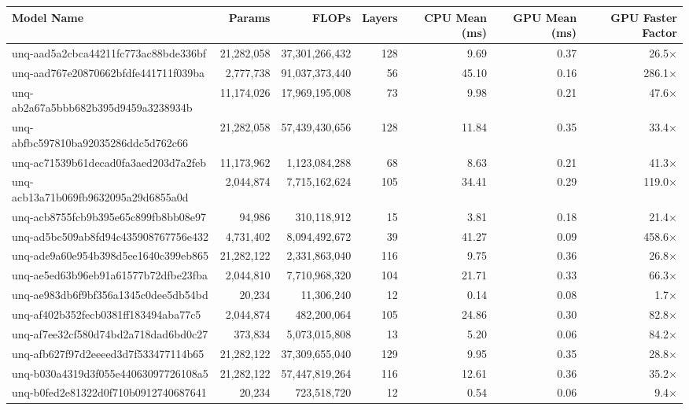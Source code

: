 \begin{table}[h!]
\centering
\fontsize{7}{9}\selectfont
\begin{tabular}{lrrrrrr}
\toprule
\textbf{Model Name} & \textbf{Params} & \textbf{FLOPs} & \textbf{Layers} & \textbf{CPU Mean (ms)} & \textbf{GPU Mean (ms)} & \textbf{GPU Faster Factor} \\
\midrule
unq-aad5a2cbca44211fc773ac88bde336bf & 21,282,058 & 37,301,266,432 & 128 & 9.69 & 0.37 & 26.5$\times$ \\
unq-aad767e20870662bfdfe441711f039ba & 2,777,738 & 91,037,373,440 & 56 & 45.10 & 0.16 & 286.1$\times$ \\
unq-ab2a67a5bbb682b395d9459a3238934b & 11,174,026 & 17,969,195,008 & 73 & 9.98 & 0.21 & 47.6$\times$ \\
unq-abfbc597810ba92035286ddc5d762c66 & 21,282,058 & 57,439,430,656 & 128 & 11.84 & 0.35 & 33.4$\times$ \\
unq-ac71539b61decad0fa3aed203d7a2feb & 11,173,962 & 1,123,084,288 & 68 & 8.63 & 0.21 & 41.3$\times$ \\
unq-acb13a71b069fb9632095a29d6855a0d & 2,044,874 & 7,715,162,624 & 105 & 34.41 & 0.29 & 119.0$\times$ \\
unq-acb8755fcb9b395e65c899fb8bb08e97 & 94,986 & 310,118,912 & 15 & 3.81 & 0.18 & 21.4$\times$ \\
unq-ad5bc509ab8fd94c435908767756e432 & 4,731,402 & 8,094,492,672 & 39 & 41.27 & 0.09 & 458.6$\times$ \\
unq-ade9a60e954b398d5ee1640c399eb865 & 21,282,122 & 2,331,863,040 & 116 & 9.75 & 0.36 & 26.8$\times$ \\
unq-ae5ed63b96eb91a61577b72dfbe23fba & 2,044,810 & 7,710,968,320 & 104 & 21.71 & 0.33 & 66.3$\times$ \\
unq-ae983db6f9bf356a1345c0dee5db54bd & 20,234 & 11,306,240 & 12 & 0.14 & 0.08 & 1.7$\times$ \\
unq-af402b352fecb0381ff183494aba77c5 & 2,044,874 & 482,200,064 & 105 & 24.86 & 0.30 & 82.8$\times$ \\
unq-af7ee32cf580d74bd2a718dad6bd0c27 & 373,834 & 5,073,015,808 & 13 & 5.20 & 0.06 & 84.2$\times$ \\
unq-afb627f97d2eeeed3d7f533477114b65 & 21,282,122 & 37,309,655,040 & 129 & 9.95 & 0.35 & 28.8$\times$ \\
unq-b030a4319d3f055e44063097726108a5 & 21,282,122 & 57,447,819,264 & 116 & 12.61 & 0.36 & 35.2$\times$ \\
unq-b0fed2e81322d0f710b0912740687641 & 20,234 & 723,518,720 & 12 & 0.54 & 0.06 & 9.4$\times$ \\

\end{tabular}
\end{table}
